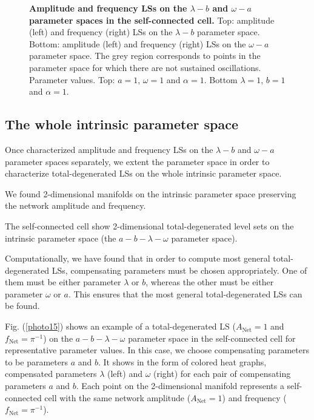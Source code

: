 \begin{figure}[h]
\begin{minipage}{0.45\linewidth}
  \end{minipage} 
  
  \caption{\textbf{Amplitude and frequency LSs on the $\lambda-b$ and $\omega-a$ parameter spaces in the self-connected cell.} Top: amplitude (left) and frequency (right) LSs on the $\lambda-b$ parameter space. Bottom: amplitude (left) and frequency (right) LSs on the $\omega-a$ parameter space. The grey region corresponds to points in the parameter space for which there are not sustained oscillations. Parameter values. Top: $a = 1$, $\omega = 1$ and $\alpha = 1$. Bottom $\lambda = 1$, $b=1$ and $\alpha = 1$.}
  \label{photo14}
\end{figure}

\subsection{The whole intrinsic parameter space}
Once characterized amplitude and frequency LSs on the $\lambda-b$ and $\omega-a$ parameter spaces separately, we extent the parameter space in order to characterize total-degenerated LSs on the whole intrinsic parameter space.

We found 2-dimensional manifolds on the intrinsic parameter space preserving the network amplitude and frequency.

\begin{Statement}
The self-connected cell show 2-dimensional total-degenerated level sets on the intrinsic parameter space (the $a-b-\lambda-\omega$ parameter space).
\label{s10}
\end{Statement}

Computationally, we have found that in order to compute most general total-degenerated LSs, compensating parameters must be chosen appropriately. One of them must be either parameter $\lambda$ or $b$, whereas the other must be either parameter $\omega$ or $a$. This ensures that the most general total-degenerated LSs can be found.
 
Fig. (\ref{photo15}) shows an example of a total-degenerated LS ($A_{\text{Net}} = 1 $ and $f_{\text{Net}} = \pi^{-1}$) on the $a-b-\lambda-\omega$ parameter space in the self-connected cell for representative parameter values. In this case, we choose compensating parameters to be parameters $a$ and $b$. It shows in the form of colored heat graphs, compensated parameters $\lambda$ (left) and $\omega$ (right) for each pair of compensating parameters $a$ and $b$. Each point on the 2-dimensional manifold represents a self-connected cell with the same network amplitude ($A_{\text{Net}} = 1 $) and frequency ($f_{\text{Net}} = \pi^{-1}$).

